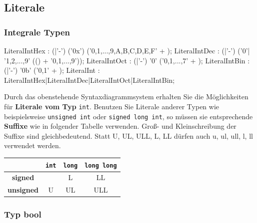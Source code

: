 \documentclass[a4paper]{report}
\begin{document}
\subsection{Literale}

\subsubsection{Integrale Typen}

\begin{center}
\begin{mdframed}[rightmargin=70pt, leftmargin=70pt, linewidth= 0pt]

\begin{rail}
	LiteralIntHex : (|'-') ('0x') ('0,1,...,9,A,B,C,D,E,F' +  );
	LiteralIntDec : (|'-') ('0'| '1,2,...,9' (() + '0,1,...,9'));
	LiteralIntOct : (|'-') '0' ('0,1,...,7' +  );
	LiteralIntBin : (|'-') '0b' ('0,1' +  );
	LiteralInt    : LiteralIntHex|LiteralIntDec|LiteralIntOct|LiteralIntBin;
\end{rail}
\end{mdframed}
\end{center}

Durch das obenstehende Syntaxdiagrammsystem erhalten Sie die Möglichkeiten für \textbf{Literale vom Typ} \texttt{int}. Benutzen Sie Literale anderer Typen wie beispielsweise \texttt{unsigned int} oder \texttt{signed long int}, so müssen sie entsprechende \textbf{Suffixe} wie in folgender Tabelle verwenden. Groß- und Kleinschreibung der Suffixe sind gleichbedeutend. Statt U, UL, ULL, L, LL dürfen auch u, ul, ull, l, ll verwendet werden.

\begin{center}
\begin{tabular}{|c|ccc|}
	\hline
	& 					\texttt{int} &		\texttt{long} &		\texttt{long long} \\ \hline
	\textbf{signed} &	&					L &					LL \\
	\textbf{unsigned}&	U &					UL &				ULL \\ \hline
\end{tabular}
\end{center}
\subsubsection{Typ bool}
\end{document}
